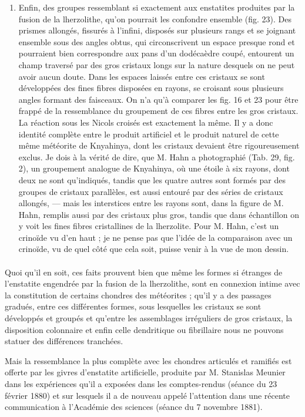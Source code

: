 \documentclass[a4paper, 12pt, oneside, french]{article}
\begin{document}
\begin{enumerate}
\item Enfin, des groupes ressemblant si exactement aux enstatites produites par la fusion de la lherzolithe, qu'on pourrait les confondre ensemble (fig. 23). Des prismes allongés, fissurés à l'infini, disposés sur plusieurs rangs et se joignant ensemble sous des angles obtus, qui circonscrivent un espace presque rond et pourraient bien correspondre aux pans d'un dodécaèdre coupé, entourent un champ traversé par des gros cristaux longs sur la nature desquels on ne peut avoir aucun doute. Dans les espaces laissés entre ces cristaux se sont développées des fines fibres disposées en rayons, se croisant sous plusieurs angles formant des faisceaux. On n'a qu'à comparer les fig. 16 et 23 pour être frappé de la ressemblance du groupement de ces fibres entre les gros cristaux. La réaction sous les Nicols croisés est exactement la même. Il y a donc identité complète entre le produit artificiel et le produit naturel de cette même météorite de Knyahinya, dont les cristaux devaient être rigoureusement exclus. Je dois à la vérité de dire, que M. Hahn a photographié (Tab. 29, fig. 2), un groupement analogue de Knyahinya, où une étoile à six rayons, dont deux ne sont qu'indiqués, tandis que les quatre autres sont formés par des groupes de cristaux parallèles, est aussi entouré par des séries de cristaux allongés, --- mais les interstices entre les rayons sont, dans la figure de M. Hahn, remplis aussi par des cristaux plus gros, tandis que dans échantillon on y voit les fines fibres cristallines de la lherzolite. Pour M. Hahn, c'est un crinoïde vu d'en haut ; je ne pense pas que l'idée de la comparaison avec un crinoïde, vu de quel côté que cela soit, puisse venir à la vue de mon dessin.
\end{enumerate}
\paragraph{}
Quoi qu'il en soit, ces faits prouvent bien que même les formes si étranges de l'enstatite engendrée par la fusion de la lherzolithe, sont en connexion intime avec la constitution de certains chondres des météorites ; qu'il y a des passages gradués, entre ces différentes formes, sous lesquelles les cristaux se sont développés et groupés et qu'entre les assemblages irréguliers de gros cristaux, la disposition colonnaire et enfin celle dendritique ou fibrillaire nous ne pouvons statuer des différences tranchées.

Mais la ressemblance la plus complète avec les chondres articulés et ramifiés est offerte par les givres d'enstatite artificielle, produite par M. Stanislas Meunier dans les expériences qu'il a exposées dans les comptes-rendus (séance du 23 février 1880) et sur lesquels il a de nouveau appelé l'attention dans une récente communication à l'Académie des sciences (séance du 7 novembre 1881).
\end{document}
